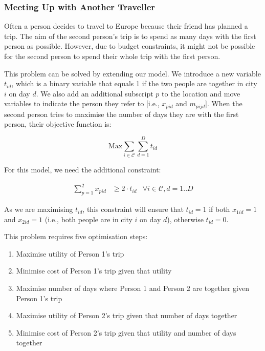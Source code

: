 \documentclass[12pt]{article}
\begin{document}
\subsubsection{Meeting Up with Another Traveller}

Often a person decides to travel to Europe because their friend has planned a trip. The aim of the second person's trip is to spend as many days with the first person as possible. However, due to budget constraints, it might not be possible for the second person to spend their whole trip with the first person.

This problem can be solved by extending our model. We introduce a new variable $t_{id}$, which is a binary variable that equals 1 if the two people are together in city $i$ on day $d$. We also add an additional subscript $p$ to the location and move variables to indicate the person they refer to [i.e., $x_{pid}$ and $m_{pijd}$]. When the second person tries to maximise the number of days they are with the first person, their objective function is:

\begin{equation*}
	\text{Max} \sum_{i \in \mathcal{C}} \sum_{d = 1}^{D} t_{id}
\end{equation*}

For this model, we need the additional constraint:

\begin{align}
	\sum_{p = 1}^{2} x_{pid} & \geq 2 \cdot t_{id} & \forall i \in \mathcal{C}, d = 1..D
\end{align}

As we are maximising $t_{id}$, this constraint will ensure that $t_{id} = 1$ if both $x_{1id} = 1$ and $x_{2id} = 1$ (i.e., both people are in city $i$ on day $d$), otherwise $t_{id} = 0$.

This problem requires five optimisation steps:

\begin{enumerate}
	\item Maximise utility of Person 1's trip
	\item Minimise cost of Person 1's trip given that utility
	\item Maximise number of days where Person 1 and Person 2 are together given Person 1's trip
	\item Maximise utility of Person 2's trip given that number of days together
	\item Minimise cost of Person 2's trip given that utility and number of days together
\end{enumerate}
\end{document}
